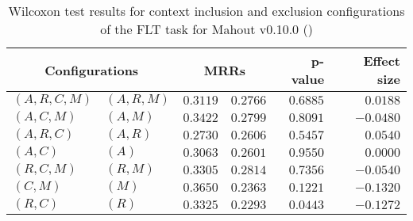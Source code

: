 
\begin{table}
\begin{spacing}{1.2}
\centering
\caption{Wilcoxon test results for context inclusion and exclusion configurations of the FLT task for Mahout v0.10.0 (\ctwo)}
\label{table:versus-wilcox-mahout-flt-context}
\begin{tabular}{ll|rr|rr}
\toprule
      \multicolumn{2}{c|}{Configurations} &                \multicolumn{2}{c|}{MRRs} &        p-value & Effect size \\
\midrule
 $(A,R,C,M)$ &  $(A,R,M)$ &  $\bm{0.3119}$ &  $0.2766$ & $0.6885$ &    $0.0188$ \\
   $(A,C,M)$ &    $(A,M)$ &  $\bm{0.3422}$ &  $0.2799$ & $0.8091$ &   $-0.0480$ \\
   $(A,R,C)$ &    $(A,R)$ &  $\bm{0.2730}$ &  $0.2606$ & $0.5457$ &    $0.0540$ \\
     $(A,C)$ &      $(A)$ &  $\bm{0.3063}$ &  $0.2601$ & $0.9550$ &    $0.0000$ \\
   $(R,C,M)$ &    $(R,M)$ &  $\bm{0.3305}$ &  $0.2814$ & $0.7356$ &   $-0.0540$ \\
     $(C,M)$ &      $(M)$ &  $\bm{0.3650}$ &  $0.2363$ & $0.1221$ &   $-0.1320$ \\
     $(R,C)$ &      $(R)$ &  $\bm{0.3325}$ &  $0.2293$ & $0.0443$ &   $-0.1272$ \\
\bottomrule
\end{tabular}

\end{spacing}
\end{table}

